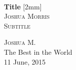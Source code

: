 \documentclass{article}
\begin{document}
\begin{titlepage}
     \begin{center}
      \\
     [0.25in]
     \huge{\bfseries Title}
     [2mm]
     \\
     [1.5cm]
     \textsc{\LARGE Joshua Morris}\\
     [0.75cm]
     \textsc{\Large Subtitle}
     \end{center}
     \begin{flushright}
     \textsc{\large Joshua M.\\}
     The Best in the World\\
     11 June, 2015

     \end{flushright}
\end{titlepage}
\end{document}
